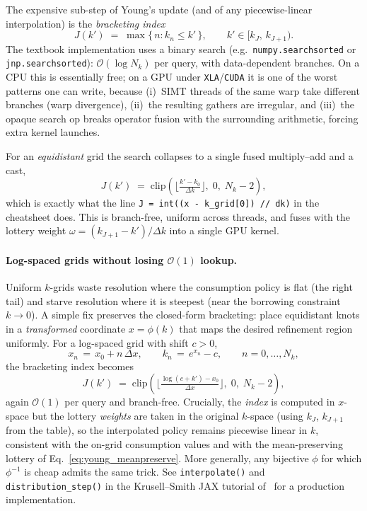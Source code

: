 \documentclass[11pt,a4paper]{report}
\begin{document}
\begin{remarkbox}
The expensive sub-step of Young's update (and of any piecewise-linear interpolation) is the \emph{bracketing index}
\[
  J(k') \;=\; \max\{\,n : k_n \le k'\,\},\qquad k' \in [k_J,\, k_{J+1}).
\]
The textbook implementation uses a binary search (e.g.\ \texttt{numpy.searchsorted} or \texttt{jnp.searchsorted}): $\mathcal{O}(\log N_k)$ per query, with data-dependent branches.  On a CPU this is essentially free; on a GPU under \texttt{XLA}/\texttt{CUDA} it is one of the worst patterns one can write, because (i)~SIMT threads of the same warp take different branches (warp divergence), (ii)~the resulting gathers are irregular, and (iii)~the opaque search op breaks operator fusion with the surrounding arithmetic, forcing extra kernel launches.

For an \emph{equidistant} grid the search collapses to a single fused multiply--add and a cast,
\[
  J(k') \;=\; \mathrm{clip}\!\left(\Big\lfloor \tfrac{k' - k_0}{\Delta k} \Big\rfloor,\;0,\;N_k-2\right),
\]
which is exactly what the line \verb|J = int((x - k_grid[0]) // dk)| in the cheatsheet does.  This is branch-free, uniform across threads, and fuses with the lottery weight $\omega = (k_{J+1}-k')/\Delta k$ into a single GPU kernel.

\paragraph{Log-spaced grids without losing $\mathcal{O}(1)$ lookup.}  Uniform $k$-grids waste resolution where the consumption policy is flat (the right tail) and starve resolution where it is steepest (near the borrowing constraint $k\!\to\!0$).  A simple fix preserves the closed-form bracketing: place equidistant knots in a \emph{transformed} coordinate $x = \phi(k)$ that maps the desired refinement region uniformly.  For a log-spaced grid with shift $c>0$,
\[
  x_n \,=\, x_0 + n\,\Delta x,\qquad k_n \,=\, e^{x_n} - c,\qquad n=0,\dots,N_k,
\]
the bracketing index becomes
\[
  J(k') \;=\; \mathrm{clip}\!\left(\Big\lfloor \tfrac{\log(c+k') - x_0}{\Delta x}\Big\rfloor,\;0,\;N_k-2\right),
\]
again $\mathcal{O}(1)$ per query and branch-free.  Crucially, the \emph{index} is computed in $x$-space but the lottery \emph{weights} are taken in the original $k$-space (using $k_J$, $k_{J+1}$ from the table), so the interpolated policy remains piecewise linear in $k$, consistent with the on-grid consumption values and with the mean-preserving lottery of Eq.~\eqref{eq:young_meanpreserve}.  More generally, any bijective $\phi$ for which $\phi^{-1}$ is cheap admits the same trick.  See \texttt{interpolate()} and \texttt{distribution\_step()} in the Krusell--Smith JAX tutorial of \citet{azinovicyangzemlicka2025sequencespace}~for a production implementation.
\end{remarkbox}
\end{document}
